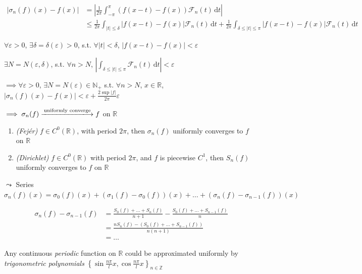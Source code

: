 \begin{align*}
    \left|\sigma_n(f)(x)-f(x)\right|
     & =\left|\frac{1}{2\pi}\int_{-\pi}^{\pi}\left(f(x-t)-f(x)\right)\mathcal{F}_n(t)\,\mathrm{d}t\right|                                                                                         \\
     & \leq\frac{1}{2\pi}\int_{|t|\leq\delta}\left|f(x-t)-f(x)\right|\mathcal{F}_n(t)\,\mathrm{d}t+\frac{1}{2\pi}\int_{\delta\leq|t|\leq\pi}\left|f(x-t)-f(x)\right|\mathcal{F}_n(t)\,\mathrm{d}t
\end{align*}

$\forall\varepsilon>0$, $\exists\delta=\delta(\varepsilon)>0$, s.t. $\forall|t|<\delta$, $\left|f(x-t)-f(x)\right|<\varepsilon$

$\exists N=N(\varepsilon,\delta)$, s.t. $\forall n>N$, $\left|\int_{\delta\leq|t|\leq\pi}\mathcal{F}_n(t)\,\mathrm{d}t\right|<\varepsilon$

$\implies\forall\varepsilon>0$, $\exists N=N(\varepsilon)\in\mathbb{N}_+$ s.t. $\forall n>N$, $x\in\mathbb{R}$, $\left|\sigma_n(f)(x)-f(x)\right|<\varepsilon+\frac{2\sup|f|}{2\pi}\varepsilon$

$\implies\sigma_n(f)\xlongrightarrow{\text{uniformly converge}}f$ on $\mathbb{R}$

\begin{theorem}
    \begin{enumerate}
        \item \emph{(Fejér)} $f\in C^0(\mathbb{R})$, with period $2\pi$, then $\sigma_n(f)$ uniformly converges to $f$ on $\mathbb{R}$
        \item \emph{(Dirichlet)} $f\in C^0(\mathbb{R})$ with period $2\pi$, and $f$ is piecewise $C^1$, then $S_n(f)$ uniformly converges to $f$ on $\mathbb{R}$
    \end{enumerate}

    $\leadsto$ Series $\sigma_n(f)(x)=\sigma_0(f)(x)+\left(\sigma_1(f)-\sigma_0(f)\right)(x)+\dots+\left(\sigma_n(f)-\sigma_{n-1}(f)\right)(x)$

    \begin{align*}
        \sigma_n(f)-\sigma_{n-1}(f)
         & =\frac{S_0(f)+\dots+S_n(f)}{n+1}-\frac{S_0(f)+\dots+S_{n-1}(f)}{n} \\
         & =\frac{nS_n(f)-\left(S_0(f)+\dots+S_{n-1}(f)\right)}{n(n+1)}       \\
         & =\dots
    \end{align*}
\end{theorem}

\begin{corollary}
    Any continuous \emph{periodic} function on $\mathbb{R}$ could be approximated uniformly by \emph{trigonometric polynomials} $\left\{\sin\frac{n\pi}{l}x,\cos\frac{n\pi}{l}x\right\}_{n\in\mathbb{Z}}$
\end{corollary}